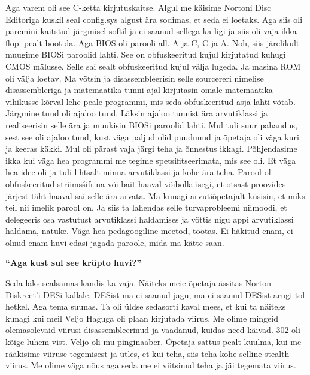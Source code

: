 Aga varem oli see C-ketta kirjutuskaitse. Algul me käisime Nortoni Disc Editoriga kuskil seal config.sys algust ära sodimas, et seda ei loetaks. Aga siis oli paremini kaitstud järgmisel softil ja ei saanud sellega ka ligi ja siis oli vaja ikka flopi pealt bootida. Aga BIOS oli parooli all. A ja C, C ja A. Noh, siis järelikult muugime BIOSi paroolid lahti. See on obfuskeeritud kujul kirjutatud kuhugi CMOS mälusse. Selle sai sealt obfuskeeritud kujul välja lugeda. Ja masina ROM oli välja loetav. Ma võtsin ja disassembleerisin selle sourcereri nimelise disassembleriga ja matemaatika tunni ajal kirjutasin omale matemaatika vihikusse kõrval lehe peale programmi, mis seda obfuskeeritud asja lahti võtab. Järgmine tund oli ajaloo tund. Läksin ajaloo tunnist ära arvutiklassi ja realiseerisin selle ära ja muukisin BIOSi paroolid lahti. Mul tuli suur pahandus, sest see oli ajaloo tund, kust väga paljud olid puudunud ja õpetaja oli väga kuri ja keeras käkki. Mul oli pärast vaja järgi teha ja õnnestus ikkagi. Põhjendasime ikka kui väga hea programmi me tegime spetsifitseerimata, mis see oli. Et väga hea idee oli ja tuli lihtsalt minna arvutiklassi ja kohe ära teha. Parool oli obfuskeeritud striimsšifrina või bait haaval võibolla isegi, et otsast proovides järjest täht haaval sai selle ära arvata. Ma kunagi arvutiõpetajalt küsisin, et miks teil nii imelik parool on. Ja siis ta lahendas selle turvaprobleemi niimoodi, et delegeeris osa vastutust arvutiklassi haldamises ja võttis nigu appi arvutiklassi haldama, natuke. Väga hea pedagoogiline meetod, töötas. Ei häkitud enam, ei olnud enam huvi edasi jagada paroole, mida ma kätte saan. 


\textbf{\enquote{Aga kust sul see krüpto huvi?}}

Seda läks sealsamas kandis ka vaja. Näiteks meie õpetaja ässitas Norton Diskreet'i DESi kallale. DESist ma ei saanud jagu, ma ei saanud DESist arugi tol hetkel. Aga tema suunas. Ta oli üldse sedasorti kaval mees, et kui ta näiteks kunagi kui meil Veljo Haguga oli plaan kirjutada viirus. Me olime mingeid olemasolevaid viirusi disassembleerinud ja vaadanud, kuidas need käivad. 302 oli kõige lühem vist. Veljo oli mu pinginaaber. Õpetaja sattus pealt kuulma, kui me rääkisime viiruse tegemisest ja ütles, et kui teha, siis teha kohe selline stealth-viirus. Me olime väga nõus aga seda me ei viitsinud teha ja jäi tegemata viirus. 

